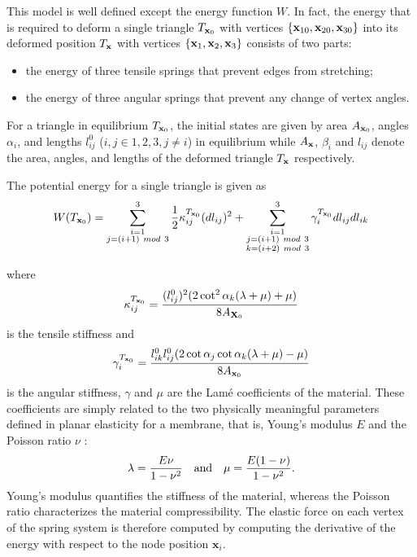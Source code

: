 This model is well defined except the energy function $W$. 
In fact, the energy that is required to
deform a single triangle $T_{\mathbf{x}_{0}}$ with vertices
$\{\mathbf{x}_{10},\mathbf{x}_{20},\mathbf{x}_{30}\}$ into its deformed position
$T_{\mathbf{x}}$ with vertices $\{\mathbf{x}_{1},\mathbf{x}_{2},\mathbf{x}_{3}\}$
consists of two parts: 

\begin{itemize} 
\item the energy of three tensile springs
that prevent edges from stretching; 
\item the energy of three angular springs
that prevent any change of vertex angles.  
\end{itemize} 

For a triangle in
equilibrium $T_{\mathbf{x}_{0}}$, the initial states are given by area
$A_{\mathbf{x}_{0}}$, angles $\alpha_{i}$, and lengths $l_{ij}^{0}$
($i,j\in{1,2,3}, j\neq i$) in equilibrium while $A_{\mathbf{x}}$, $\beta_{i}$ and
$l_{ij}$ denote the area, angles, and lengths of the deformed triangle
$T_{\mathbf{x}}$ respectively.

The potential energy for a single triangle is given as \cite{Delinget2008} 
\[
W(T_{\vect{x}_{0}})=\sum_{\substack{i=1\\j=(i+1)\ mod\
3}}^{3}\frac{1}{2}\kappa_{ij}^{T_{\vect{x}_{0}}}
(dl_{ij})^{2}+\sum_{\substack{i=1\\j=(i+1)\ mod\ 3\\k=(i+2)\ mod\
3}}^{3}\gamma_{i}^{T_{\vect{x}_{0}}}dl_{ij}dl_{ik} 
\]

where \[
\kappa_{ij}^{T_{\mathbf{x}_{0}}}=\frac{(l_{ij}^{0})^{2}(2\cot^{2}\alpha_{k}
(\lambda+\mu)+\mu)}{8A_{\mathbf{X}_{0}}} \] 
is the tensile stiffness and
\begin{equation}
\gamma_{i}^{T_{\mathbf{x}_{0}}}=\frac{l_{ik}^{0}l_{ij}^{0}(2\cot\alpha_{j}
\cot\alpha_{k}(\lambda+\mu)-\mu)}{8A_{\mathbf{x}_{0}}} \label{eq:angular_stiff}
\end{equation} 
is the angular stiffness, $\gamma$ and $\mu$ are the Lam\'{e}
coefficients of the material.  These coefficients are simply related to the two
physically meaningful parameters defined in planar elasticity for a membrane,
that is, Young's modulus $E$ and the Poisson ratio $\nu$ \cite{Gere2004}:
$$\lambda=\frac{E\nu}{1-\nu^{2}} ~~~{\rm and}~~~
\mu=\frac{E(1-\nu)}{1-\nu^{2}}.$$ 
Young's modulus quantifies the stiffness of
the material, whereas the Poisson ratio characterizes the material
compressibility. The elastic force on each vertex of the spring system is
therefore computed by computing the derivative of the energy with respect 
to the node position $\mathbf{x}_i$.

